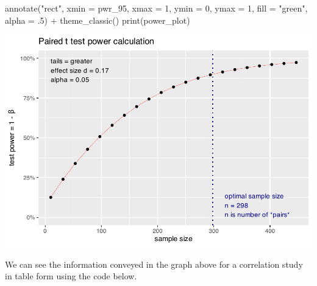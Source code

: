 \documentclass[
]{krantz}
\makeatletter
\newenvironment{Shaded}{\begin{snugshade}}{\end{snugshade}}
\newcommand{\AttributeTok}[1]{\textcolor[rgb]{0.61,0.61,0.61}{#1}}
\newcommand{\DecValTok}[1]{\textcolor[rgb]{0.06,0.06,0.06}{#1}}
\newcommand{\FunctionTok}[1]{\textcolor[rgb]{0,0,0}{#1}}
\newcommand{\NormalTok}[1]{#1}
\newcommand{\SpecialCharTok}[1]{\textcolor[rgb]{0,0,0}{#1}}
\newcommand{\StringTok}[1]{\textcolor[rgb]{0.5,0.5,0.5}{#1}}
\newenvironment{kframe}{%
\medskip{}
\setlength{\fboxsep}{.8em}
 \def\at@end@of@kframe{}%
 \ifinner\ifhmode%
  \def\at@end@of@kframe{\end{minipage}}%
  \begin{minipage}{\columnwidth}%
 \fi\fi%
 \def\FrameCommand##1{\hskip\@totalleftmargin \hskip-\fboxsep
 \colorbox{shadecolor}{##1}\hskip-\fboxsep
     \hskip-\linewidth \hskip-\@totalleftmargin \hskip\columnwidth}%
 \MakeFramed {\advance\hsize-\width
   \@totalleftmargin\z@ \linewidth\hsize
   \@setminipage}}%
 {\par\unskip\endMakeFramed%
 \at@end@of@kframe}
\renewenvironment{Shaded}{\begin{kframe}}{\end{kframe}}
\makeatother
\begin{document}
\begin{Shaded}
\begin{Highlighting}[]
  \FunctionTok{annotate}\NormalTok{(}\StringTok{"rect"}\NormalTok{, }\AttributeTok{xmin =}\NormalTok{ pwr\_95, }\AttributeTok{xmax =} \DecValTok{1}\NormalTok{, }\AttributeTok{ymin =} \DecValTok{0}\NormalTok{, }\AttributeTok{ymax =} \DecValTok{1}\NormalTok{, }\AttributeTok{fill =} \StringTok{"green"}\NormalTok{, }\AttributeTok{alpha =}\NormalTok{ .}\DecValTok{5}\NormalTok{) }\SpecialCharTok{+}
  \FunctionTok{theme\_classic}\NormalTok{()}
\FunctionTok{print}\NormalTok{(power\_plot)}
\end{Highlighting}
\end{Shaded}

\includegraphics{bookdown_files/figure-latex/unnamed-chunk-359-1.pdf}

We can see the information conveyed in the graph above for a correlation study in table form using the code below.
\end{document}

